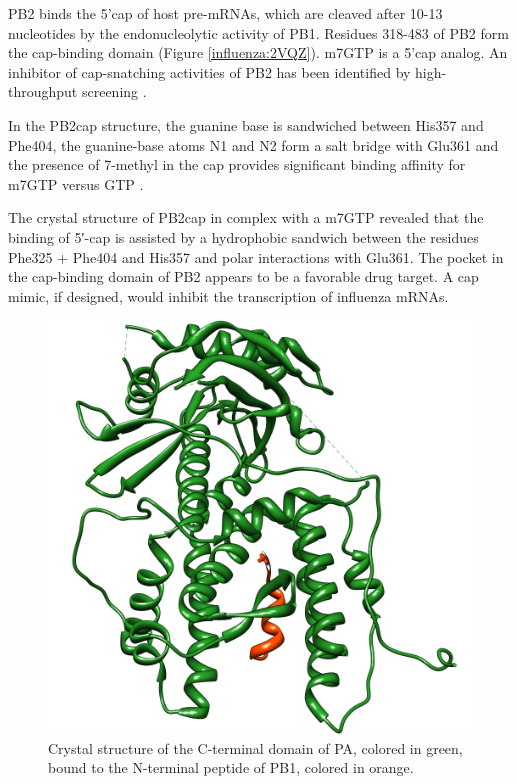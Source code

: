 PB2 binds the 5'cap of host pre-mRNAs, which are cleaved after 10-13 nucleotides by the endonucleolytic activity of PB1. Residues 318-483 of PB2 form the cap-binding domain (Figure \ref{influenza:2VQZ}). m7GTP is a 5'cap analog. An inhibitor of cap-snatching activities of PB2 has been identified by high-throughput screening \citep{1236}.

In the PB2cap structure, the guanine base is sandwiched between His357 and Phe404, the guanine-base atoms N1 and N2 form a salt bridge with Glu361 and the presence of 7-methyl in the cap provides significant binding affinity for m7GTP versus GTP \citep{1192}.

The crystal structure of PB2cap in complex with a m7GTP revealed that the binding of 5′-cap is assisted by a hydrophobic sandwich between the residues Phe325 + Phe404 and His357 and polar interactions with Glu361. The pocket in the cap-binding domain of PB2 appears to be a favorable drug target. A cap mimic, if designed, would inhibit the transcription of influenza mRNAs.%

\begin{figure}
\centering
\includegraphics[width=\linewidth]{../influenza/2ZNL.png}
\caption{Crystal structure of the C-terminal domain of PA, colored in green, bound to the N-terminal peptide of PB1, colored in orange.}
\label{influenza:2ZNL}
\end{figure}

